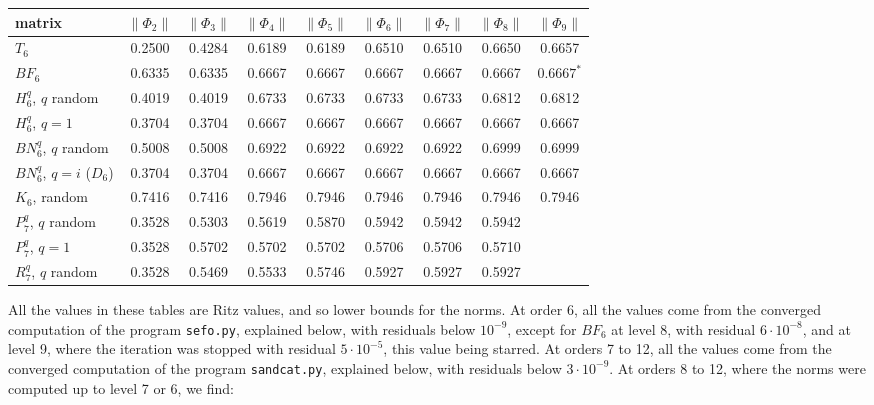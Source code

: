 \documentclass[11pt]{amsart}
\begin{document}
\medskip

\begin{center}
\small
\begin{tabular}{lcccccccc}
\toprule
matrix & $\|\Phi_2\|$ & $\|\Phi_3\|$ & $\|\Phi_4\|$ & $\|\Phi_5\|$ & $\|\Phi_6\|$ & $\|\Phi_7\|$ & $\|\Phi_8\|$ & $\|\Phi_9\|$\\
\midrule
$T_6$ & 0.2500 & 0.4284 & 0.6189 & 0.6189 & 0.6510 & 0.6510 & 0.6650 & 0.6657\\
$BF_6$ & 0.6335 & 0.6335 & 0.6667 & 0.6667 & 0.6667 & 0.6667 & 0.6667 & $0.6667^*$\\
$H_6^q$, $q$ random & 0.4019 & 0.4019 & 0.6733 & 0.6733 & 0.6733 & 0.6733 & 0.6812 & 0.6812\\
$H_6^q$, $q=1$ & 0.3704 & 0.3704 & 0.6667 & 0.6667 & 0.6667 & 0.6667 & 0.6667 & 0.6667\\
$BN_6^q$, $q$ random & 0.5008 & 0.5008 & 0.6922 & 0.6922 & 0.6922 & 0.6922 & 0.6999 & 0.6999\\
$BN_6^q$, $q=i$ ($D_6$) & 0.3704 & 0.3704 & 0.6667 & 0.6667 & 0.6667 & 0.6667 & 0.6667 & 0.6667\\
$K_6$, random & 0.7416 & 0.7416 & 0.7946 & 0.7946 & 0.7946 & 0.7946 & 0.7946 & 0.7946\\
$P_7^q$, $q$ random & 0.3528 & 0.5303 & 0.5619 & 0.5870 & 0.5942 & 0.5942 & 0.5942 &\\
$P_7^q$, $q=1$ & 0.3528 & 0.5702 & 0.5702 & 0.5702 & 0.5706 & 0.5706 & 0.5710 &\\
$R_7^q$, $q$ random & 0.3528 & 0.5469 & 0.5533 & 0.5746 & 0.5927 & 0.5927 & 0.5927 &\\
\bottomrule
\end{tabular}
\end{center}

\medskip

\noindent All the values in these tables are Ritz values, and so lower bounds for the norms. At order 6, all the values come from the converged computation of the program \texttt{sefo.py}, explained below, with residuals below $10^{-9}$, except for $BF_6$ at level 8, with residual $6\cdot10^{-8}$, and at level 9, where the iteration was stopped with residual $5\cdot10^{-5}$, this value being starred. At orders 7 to 12, all the values come from the converged computation of the program \texttt{sandcat.py}, explained below, with residuals below $3\cdot10^{-9}$. At orders 8 to 12, where the norms were computed up to level 7 or 6, we find:

\medskip
\end{document}
